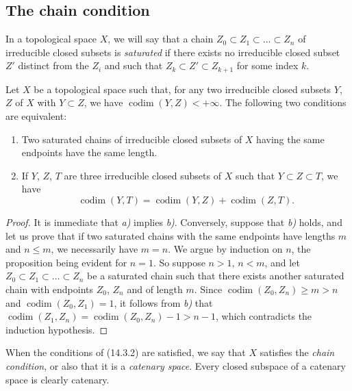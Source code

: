 \subsection{The chain condition}
\label{subsection:0.14.3}

\begin{env}[14.3.1]
\label{0.14.3.1}
In a topological space $X$, we will say that a chain
$Z_0\subset Z_1\subset\ldots\subset Z_n$ of irreducible closed subsets is
\emph{saturated} if there exists no irreducible closed subset $Z'$ distinct
from the $Z_i$ and such that $Z_k\subset Z'\subset Z_{k+1}$ for some index $k$.
\end{env}

\begin{proposition}[14.3.2]
\label{0.14.3.2}
Let $X$ be a topological space such that, for any two irreducible closed
subsets $Y$, $Z$ of $X$ with $Y\subset Z$, we have
$\operatorname{codim}(Y,Z)<+\infty$. The following two conditions are
equivalent:
\begin{enumerate}
  \item[\rm a)] Two saturated chains of irreducible closed subsets of $X$
  having the same endpoints have the same length.
  \item[\rm b)] If $Y$, $Z$, $T$ are three irreducible closed subsets of
  $X$ such that $Y\subset Z\subset T$, we have
  \[
    \operatorname{codim}(Y,T)=
    \operatorname{codim}(Y,Z)+\operatorname{codim}(Z,T).
    \tag{14.3.2.1}\label{0.14.3.2.1}
  \]
\end{enumerate}
\end{proposition}

\begin{proof}
It is immediate that \emph{a)} implies \emph{b)}. Conversely, suppose that \emph{b)} holds, and
let us prove that if two saturated chains with the same endpoints have lengths
$m$ and $n\leq m$, we necessarily have $m=n$. We argue by induction on
$n$, the proposition being evident for $n=1$. So suppose $n>1$, $n<m$,
and let $Z_0\subset Z_1\subset\ldots\subset Z_n$ be a
saturated chain such that there exists another saturated chain with endpoints
$Z_0$, $Z_n$ and of length $m$. Since
$\operatorname{codim}(Z_0,Z_n)\geq m>n$ and
$\operatorname{codim}(Z_0,Z_1)=1$, it follows from \emph{b)} that
$\operatorname{codim}(Z_1,Z_n)=\operatorname{codim}(Z_0,Z_n)-1>n-1$, which
contradicts the induction hypothesis.
\end{proof}

When the conditions of (14.3.2) are satisfied, we say that $X$ satisfies
the \emph{chain condition}, or also that it is a \emph{catenary space}.
Every closed subspace of a catenary space is clearly catenary.

